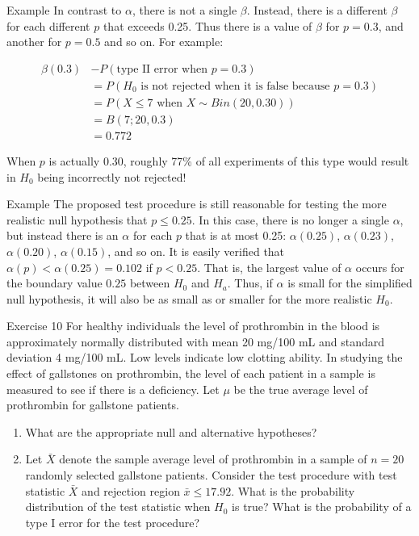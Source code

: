 \documentclass[
  ignorenonframetext,
]{beamer}
\providecommand{\tightlist}{%
  \setlength{\itemsep}{0pt}\setlength{\parskip}{0pt}}\usepackage{longtable,booktabs,array}
\begin{document}
\begin{frame}{Example}
\protect\hypertarget{example-5}{}
In contrast to \(\alpha\), there is not a single \(\beta\). Instead,
there is a different \(\beta\) for each different \(p\) that exceeds
0.25. Thus there is a value of \(\beta\) for \(p=0.3\), and another for
\(p=0.5\) and so on. For example:

\[
\begin{aligned}
\beta(0.3) &- P(\text{type II error when } p = 0.3) \\
&= P(H_{0} \text{ is not rejected when it is false because } p = 0.3) \\
&= P(X \leq 7 \text{ when } X \sim Bin(20, 0.30)) \\
&= B(7; 20, 0.3) \\
&= 0.772
\end{aligned}
\]

When \(p\) is actually 0.30, roughly 77\% of all experiments of this
type would result in \(H_{0}\) being incorrectly not rejected!
\end{frame}

\begin{frame}{Example}
\protect\hypertarget{example-6}{}
The proposed test procedure is still reasonable for testing the more
realistic null hypothesis that \(p \leq 0.25\). In this case, there is
no longer a single \(\alpha\), but instead there is an \(\alpha\) for
each \(p\) that is at most 0.25: \(\alpha(0.25)\), \(\alpha(0.23)\),
\(\alpha(0.20)\), \(\alpha(0.15)\), and so on. It is easily verified
that \(\alpha(p) < \alpha(0.25) = 0.102\) if \(p<0.25\). That is, the
largest value of \(\alpha\) occurs for the boundary value \(0.25\)
between \(H_{0}\) and \(H_{a}\). Thus, if \(\alpha\) is small for the
simplified null hypothesis, it will also be as small as or smaller for
the more realistic \(H_{0}\).
\end{frame}

\begin{frame}{Exercise 10}
\protect\hypertarget{exercise-10}{}
For healthy individuals the level of prothrombin in the blood is
approximately normally distributed with mean 20 mg/100 mL and standard
deviation 4 mg/100 mL. Low levels indicate low clotting ability. In
studying the effect of gallstones on prothrombin, the level of each
patient in a sample is measured to see if there is a deficiency. Let
\(\mu\) be the true average level of prothrombin for gallstone patients.

\begin{enumerate}[<+->]
[a.]
\tightlist
\item
  What are the appropriate null and alternative hypotheses?
\item
  Let \(\bar{X}\) denote the sample average level of prothrombin in a
  sample of \(n=20\) randomly selected gallstone patients. Consider the
  test procedure with test statistic \(\bar{X}\) and rejection region
  \(\bar{x} \leq 17.92\). What is the probability distribution of the
  test statistic when \(H_{0}\) is true? What is the probability of a
  type I error for the test procedure?
\end{enumerate}
\end{frame}
\end{document}
